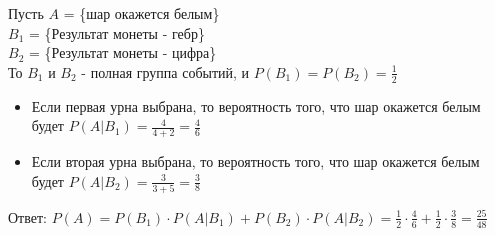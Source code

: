 \begin{exercise}[10]
	Пусть $A$ = \{шар окажется белым\} \\ $B_1$ = \{Результат монеты - гебр\} \\ $B_2$ = \{Результат монеты - цифра\} \\ То $B_1$ и $B_2$ - полная группа событий, и $P(B_1) = P(B_2) = \frac{1}{2}$
	\begin{itemize}
		\item Если первая урна выбрана, то вероятность того, что шар окажется белым будет $P(A | B_1) = \frac{4}{4+2} = \frac{4}{6}$
		\item Если вторая урна выбрана, то вероятность того, что шар окажется белым будет $P(A | B_2) = \frac{3}{3 + 5} = \frac{3}{8}$
	\end{itemize}
	Ответ: $P(A) = P(B_1) \cdot P(A | B_1) + P(B_2) \cdot P(A | B_2) = \frac{1}{2} \cdot \frac{4}{6} + \frac{1}{2} \cdot \frac{3}{8} = \frac{25}{48}$
\end{exercise}